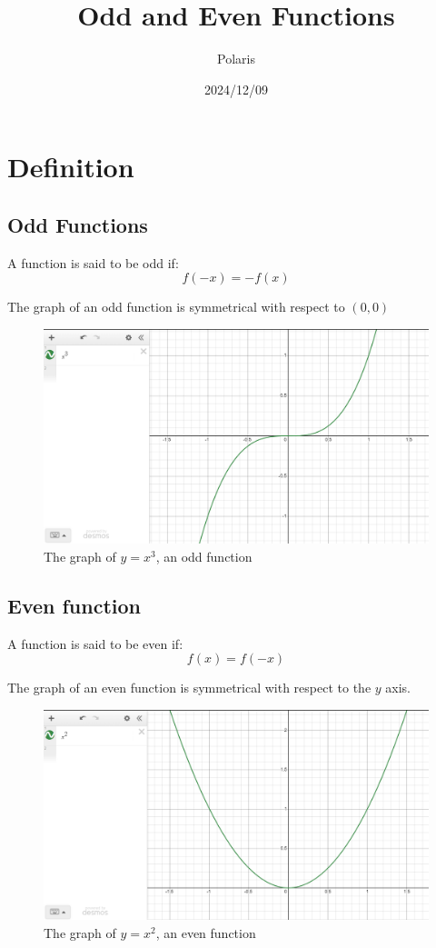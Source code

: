 \documentclass{article}
\title{Odd and Even Functions}
\author{Polaris}
\date{2024/12/09}
\numberwithin{equation}{section}
\begin{document}
\maketitle

\section{Definition}
\subsection{Odd Functions}
A function is said to be odd if:
\begin{equation}
    f(-x) = -f(x)
\end{equation}

The graph of an odd function is symmetrical with respect to $(0,0)$

\begin{figure}[H]
    \centering
    \includegraphics[width = 15cm]{pictures/oddfunction1.png}
    \caption{The graph of $y=x^3$, an odd function}
\end{figure}

\newpage
\subsection{Even function}
A function is said to be even if:
\begin{equation}
    f(x) = f(-x)
\end{equation}

The graph of an even function is symmetrical with respect to the $y$ axis.
\begin{figure}[H]
    \centering
    \includegraphics[width = 15cm]{pictures/evenfunction1.png}
    \caption{The graph of $y = x^2$, an even function}
\end{figure}
\end{document}
